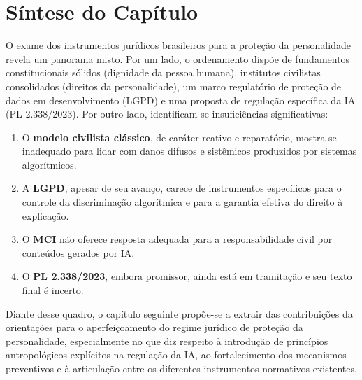 \section{Síntese do Capítulo}
\label{sec:sumario-cap4}

O exame dos instrumentos jurídicos brasileiros para a proteção da personalidade revela um panorama misto. Por um lado, o ordenamento dispõe de fundamentos constitucionais sólidos (dignidade da pessoa humana), institutos civilistas consolidados (direitos da personalidade), um marco regulatório de proteção de dados em desenvolvimento (LGPD) e uma proposta de regulação específica da IA (PL 2.338/2023). Por outro lado, identificam-se insuficiências significativas:

\begin{enumerate}
    \item O \textbf{modelo civilista clássico}, de caráter reativo e reparatório, mostra-se inadequado para lidar com danos difusos e sistêmicos produzidos por sistemas algorítmicos.
    \item A \textbf{LGPD}, apesar de seu avanço, carece de instrumentos específicos para o controle da discriminação algorítmica e para a garantia efetiva do direito à explicação.
    \item O \textbf{MCI} não oferece resposta adequada para a responsabilidade civil por conteúdos gerados por IA.
    \item O \textbf{PL 2.338/2023}, embora promissor, ainda está em tramitação e seu texto final é incerto.
\end{enumerate}

Diante desse quadro, o capítulo seguinte propõe-se a extrair das contribuições da \MH{} orientações para o aperfeiçoamento do regime jurídico de proteção da personalidade, especialmente no que diz respeito à introdução de princípios antropológicos explícitos na regulação da IA, ao fortalecimento dos mecanismos preventivos e à articulação entre os diferentes instrumentos normativos existentes.
